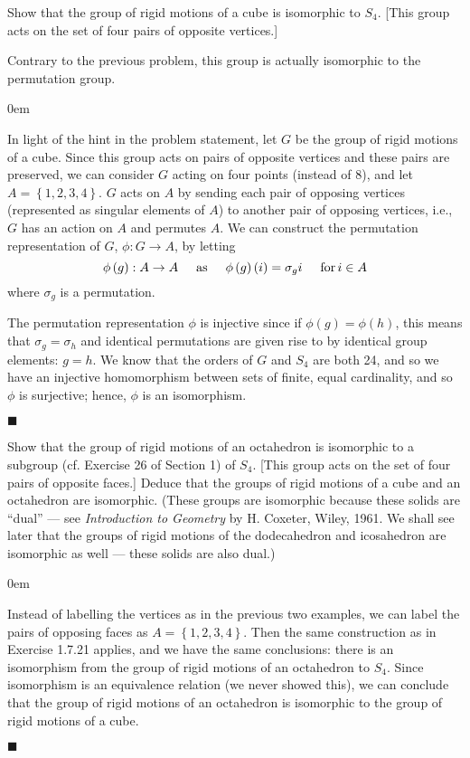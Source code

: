 \documentclass[12pt]{article}
\renewcommand{\qed}{\hfill$\blacksquare$}
\renewenvironment{proof}{\begin{addmargin}[1em]{0em}\begin{newproof}}{\end{newproof}\end{addmargin}\qed}
\newenvironment{problem}[2][Exercise]{\begin{trivlist}
\item[\hskip \labelsep {\bfseries #1}\hskip \labelsep {\bfseries #2.}]}{\end{trivlist}}
\begin{document}
\begin{problem}{1.7.21}
Show that the group of rigid motions of a cube is isomorphic to $S_4$. [This group acts on the set of four pairs of opposite vertices.]
\end{problem}
Contrary to the previous problem, this group is actually isomorphic to the permutation group.\\
\begin{proof}
In light of the hint in the problem statement, let $G$ be the group of rigid motions of a cube. Since this group acts on pairs of opposite vertices and these pairs are preserved, we can consider $G$ acting on four points (instead of 8), and let $A=\left\{1,2,3,4\right\}$. $G$ acts on $A$ by sending each pair of opposing vertices (represented as singular elements of $A$) to another pair of opposing vertices, i.e., $G$ has an action on $A$ and permutes $A$. We can construct the permutation representation of $G$, $\phi:G\rightarrow A$, by letting $$ \phi\left(g\right): A\rightarrow A \hspace{5mm} \text{as} \hspace{5mm} \phi\left(g\right)\left(i\right) = \sigma_g i \hspace{5mm} \text{for} \, i\in A $$ where $\sigma_g$ is a permutation.

The permutation representation $\phi$ is injective since if $\phi\left(g\right)=\phi\left(h\right)$, this means that $\sigma_g=\sigma_h$ and identical permutations are given rise to by identical group elements: $g=h$. We know that the orders of $G$ and $S_4$ are both 24, and so we have an injective homomorphism between sets of finite, equal cardinality, and so $\phi$ is surjective; hence, $\phi$ is an isomorphism.
\end{proof}


\begin{problem}{1.7.22}
Show that the group of rigid motions of an octahedron is isomorphic to a subgroup (cf. Exercise 26 of Section 1) of $S_4$. [This group acts on the set of four pairs of opposite faces.] Deduce that the groups of rigid motions of a cube and an octahedron are isomorphic. (These groups are isomorphic because these solids are ``dual'' --- see \textit{Introduction to Geometry} by H. Coxeter, Wiley, 1961. We shall see later that the groups of rigid motions of the dodecahedron and icosahedron are isomorphic as well --- these solids are also dual.)
\end{problem}
\begin{proof}
Instead of labelling the vertices as in the previous two examples, we can label the pairs of opposing faces as $A=\left\{1,2,3,4\right\}$. Then the same construction as in Exercise 1.7.21 applies, and we have the same conclusions: there is an isomorphism from the group of rigid motions of an octahedron to $S_4$. Since isomorphism is an equivalence relation (we never showed this), we can conclude that the group of rigid motions of an octahedron is isomorphic to the group of rigid motions of a cube.
\end{proof}
\end{document}
